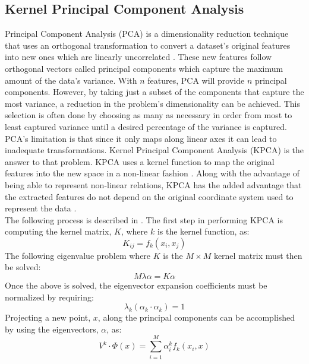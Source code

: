 \documentclass[titlepage]{article}
\begin{document}
\subsection{Kernel Principal Component Analysis}
Principal Component Analysis (PCA) is a dimensionality reduction technique that uses an orthogonal transformation to convert a dataset's original features into new ones which are linearly uncorrelated \cite{KPCA}. These new features follow orthogonal vectors called principal components which capture the maximum amount of the data's variance. With $n$ features, PCA will provide $n$ principal components. However, by taking just a subset of the components that capture the most variance, a reduction in the problem's dimensionality can be achieved. This selection is often done by choosing as many as necessary in order from most to least captured variance until a desired percentage of the variance is captured.\\
PCA's limitation is that since it only maps along linear axes it can lead to inadequate transformations. Kernel Principal Component Analysis (KPCA) is the answer to that problem. KPCA uses a kernel function to map the original features into the new space in a non-linear fashion \cite{KPCA}. Along with the advantage of being able to represent non-linear relations, KPCA has the added advantage that the extracted features do not depend on the original coordinate system used to represent the data \cite{KPCA}.\\
The following process is described in \cite{KPCA}. The first step in performing KPCA is computing the kernel matrix, $K$, where $k$ is the kernel function, as:
$$K_{ij} = f_k(x_i, x_j)$$
The following eigenvalue problem where $K$ is the $M \times M$ kernel matrix must then be solved:
$$M \lambda \alpha = K \alpha$$
Once the above is solved, the eigenvector expansion coefficients must be normalized by requiring:
$$\lambda_k (\alpha_k \cdot \alpha_k) = 1$$
Projecting a new point, $x$, along the principal components can be accomplished by using the eigenvectors, $\alpha$, as:
$$V^k \cdot \Phi(x) = \sum\limits_{i=1}^M \alpha_i^k f_k(x_i, x)$$
\end{document}
